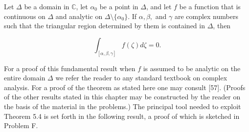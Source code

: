 Let $\Delta$ be a domain in $\mathbb{C}$, let $\alpha_0$ be a point in $\Delta$, and let $f$ be a function that is continuous on $\Delta$ and analytic on $\Delta \setminus \{\alpha_0\}$. If $\alpha, \beta,$ and $\gamma$ are complex numbers such that the triangular region determined by them is contained in $\Delta$, then

$$\int_{[\alpha, \beta, \gamma]} f(\zeta) d\zeta = 0.$$

For a proof of this fundamental result when $f$ is assumed to be analytic on the entire domain $\Delta$ we refer the reader to any standard textbook on complex analysis. For a proof of the theorem as stated here one may consult [57]. (Proofs of the other results stated in this chapter may be constructed by the reader on the basis of the material in the problems.) The principal tool needed to exploit Theorem 5.4 is set forth in the following result, a proof of which is sketched in Problem F.
